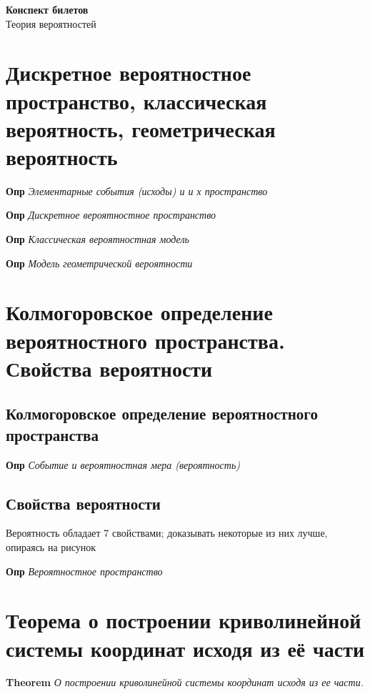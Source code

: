 \documentclass[a4paper, 14pt]{article}
\begin{document}
{\huge
    \begin{center}
    {\textbf{Конспект билетов}}
        \\
        Теория вероятностей
    \end{center}
}
    \tableofcontents \newpage
    
    \section{Дискретное вероятностное пространство, классическая вероятность, геометрическая вероятность}
    
    \textbf{Опр} \textit{Элементарные события (исходы) и и х пространство}
    
    \textbf{Опр} \textit{Дискретное вероятностное пространство}
    
    \textbf{Опр} \textit{Классическая вероятностная модель}
    
    \textbf{Опр} \textit{Модель геометрической вероятности}
    
    \section{Колмогоровское определение вероятностного пространства.
    Свойства вероятности}
    
    \subsection{Колмогоровское определение вероятностного пространства}
    
    \textbf{Опр} \textit{Событие и вероятностная мера (вероятность)}
    
    \subsection{Свойства вероятности}
    
    Вероятность обладает 7 свойствами; доказывать некоторые из них лучше, опираясь на рисунок
    
    \textbf{Опр} \textit{Вероятностное пространство}
    
    \section{Теорема о построении криволинейной системы координат исходя из её части}
    
    \textbf{Theorem} \textit{О построении криволинейной системы координат исходя из ее части.}
    
\end{document}

